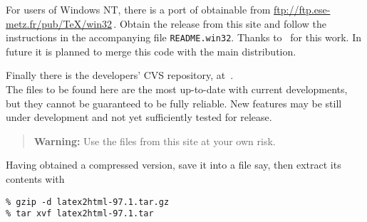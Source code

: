 \bigskip
{}%
\noindent
{}\begin{changebar}%
For users of Windows NT, there is a port of \latextohtml{} obtainable
from \url{ftp://ftp.ese-metz.fr/pub/TeX/win32}\,. Obtain the release from
this site and follow the instructions in the accompanying file
\texttt{README.win32}. \html{\\}Thanks to \Popineau\ for this work.\html{\\}
In future it is planned to merge this code with the main distribution.
\end{changebar}

\bigskip
{}\label{cvsrepos}%
\noindent
{}\begin{changebar}%
Finally there is the \latextohtml{} developers' CVS repository, at \CVSrepos\,.\\
The files to be found here are the most up-to-date with current developments,
but they cannot be guaranteed to be fully reliable. New features may be
still under development and not yet sufficiently tested for release.

\begin{quote}
\textbf{Warning: }Use the files from this site at your own risk.
\end{quote}%
\end{changebar}

\htmlrule{}%
\medskip\noindent
Having obtained a compressed  version, save it into a file
 say,
then extract its contents with
\begin{small}
\begin{verbatim}
% gzip -d latex2html-97.1.tar.gz
% tar xvf latex2html-97.1.tar
\end{verbatim}
\end{small}
%

